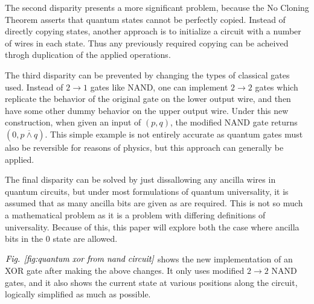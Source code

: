 \documentclass[12pt]{article}
\newcommand{\nand}{\overline{\land}}
\begin{document}
The second disparity presents a more significant problem, because the No Cloning Theorem asserts that quantum states cannot be perfectly copied. Instead of directly copying states, another approach is to initialize a circuit with a number of wires in each state. Thus any previously required copying can be acheived throgh duplication of the applied operations.

The third disparity can be prevented by changing the types of classical gates used. Instead of $2 \to 1$ gates like NAND, one can implement $2 \to 2$ gates which replicate the behavior of the original gate on the lower output wire, and then have some other dummy behavior on the upper output wire. Under this new construction, when given an input of $(p, q)$, the modified NAND gate returns $(0, p \nand q)$. This simple example is not entirely accurate as quantum gates must also be reversible for reasons of physics, but this approach can generally be applied.

The final disparity can be solved by just dissallowing any ancilla wires in quantum circuits, but under most formulations of quantum universality, it is assumed that as many ancilla bits are given as are required. This is not so much a mathematical problem as it is a problem with differing definitions of universality. Because of this, this paper will explore both the case where ancilla bits in the 0 state are allowed.

$\emph{Fig. \ref{fig:quantum xor from nand circuit}}$ shows the new implementation of an XOR gate after making the above changes. It only uses modified $2 \to 2$ NAND gates, and it also shows the current state at various positions along the circuit, logically simplified as much as possible.
\end{document}
